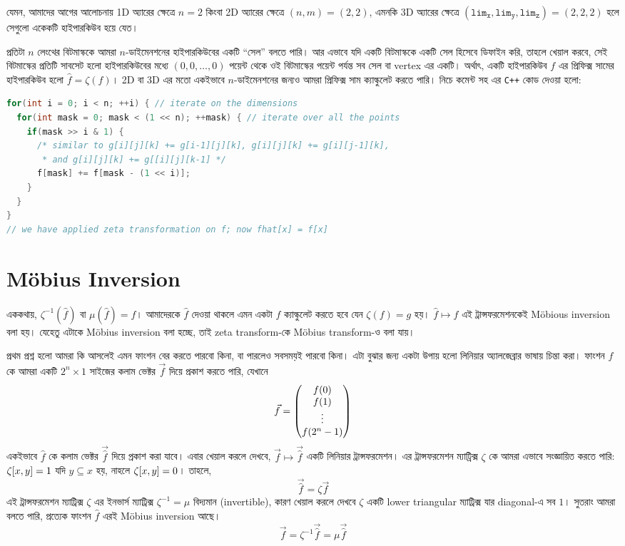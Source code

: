 যেমন, আমাদের আগের আলোচনায় 1D অ্যারের ক্ষেত্রে $n=2$ কিংবা 2D অ্যারের ক্ষেত্রে
$(n,m) = (2,2)$, এমনকি 3D অ্যারের ক্ষেত্রে $(\mathtt{lim_x}, \mathtt{lim_y},
\mathtt{lim_z}) = (2,2,2)$ হলে সেগুলো একেকটি হাইপারকিউব হয়ে যেত।

প্রতিটা $n$ লেংথের বিটমাস্ককে আমরা $n$-ডাইমেনশনের হাইপারকিউবের একটি ``সেল''
বলতে পারি। আর এভাবে যদি একটি বিটমাস্ককে একটি সেল হিসেবে ডিফাইন করি, তাহলে
খেয়াল করবে, সেই বিটমাস্কের প্রতিটি সাবসেট হলো হাইপারকিউবের মধ্যে $(0, 0,
\ldots, 0)$ পয়েন্ট থেকে ওই বিটমাস্কের পয়েন্ট পর্যন্ত সব সেল বা vertex এর
একটি। অর্থাৎ, একটি হাইপারকিউব $f$ এর প্রিফিক্স সামের হাইপারকিউব হলো $\hat{f}
= \zeta(f)$। 2D বা 3D এর মতো একইভাবে $n$-ডাইমেনশনের জন্যও আমরা প্রিফিক্স সাম
ক্যাল্কুলেট করতে পারি। নিচে কমেন্ট সহ এর \texttt{C++} কোড দেওয়া হলো:
\begin{lstlisting}[language=C++]
for(int i = 0; i < n; ++i) { // iterate on the dimensions
  for(int mask = 0; mask < (1 << n); ++mask) { // iterate over all the points
    if(mask >> i & 1) {
      /* similar to g[i][j][k] += g[i-1][j][k], g[i][j][k] += g[i][j-1][k],
       * and g[i][j][k] += g[[i][j][k-1] */
      f[mask] += f[mask - (1 << i)];
    }
  }
}
// we have applied zeta transformation on f; now fhat[x] = f[x]
\end{lstlisting}

\section{M{\"o}bius Inversion}
এককথায়, $\zeta^{-1}(\hat{f})$ বা $\mu(\hat{f}) = f$। আমাদেরকে
$\hat{f}$ দেওয়া থাকলে এমন
একটা $f$ ক্যাল্কুলেট করতে হবে যেন $\zeta(f) = g$ হয়। $\hat{f} \mapsto f$ এই
ট্রান্সফরমেশনকেই M{\"o}bious inversion বলা হয়। যেহেতু এটাকে M{\"o}bius
inversion বলা হচ্ছে, তাই zeta transform-কে M{\"o}bius transform-ও বলা যায়।

প্রথম প্রশ্ন হলো আমরা কি আসলেই এমন ফাংশন বের করতে পারবো কিনা, বা পারলেও
সবসময়ই পারবো কিনা। এটা বুঝার জন্য একটা উপায় হলো লিনিয়ার অ্যালজেব্রার ভাষায়
চিন্তা করা। ফাংশন $f$ কে আমরা একটি $2^n \times 1$ সাইজের কলাম ভেক্টর
$\vec{f}$ দিয়ে প্রকাশ করতে পারি, যেখানে 
\[
  \vec{f} =
  \begin{pmatrix}
    f(0)\\
    f(1)\\
    \vdots\\
    f(2^n-1)
  \end{pmatrix}
\]
একইভাবে $\hat{f}$ কে কলাম ভেক্টর $\vec{\hat{f}}$ দিয়ে প্রকাশ করা যাবে।
এবার খেয়াল করলে দেখবে, $\vec{f} \mapsto \vec{\hat{f}}$ একটি লিনিয়ার
ট্রান্সফরমেশন। এর
ট্রান্সফরমেশন ম্যাট্রিক্স $\zeta$ কে আমরা এভাবে সংজ্ঞায়িত করতে পারি:
$\zeta[x, y] = 1$ যদি $y \subseteq x$ হয়, নাহলে $\zeta[x, y] = 0$।
তাহলে,
\[
  \vec{\hat{f}} = \zeta \vec{f}
\]
এই ট্রান্সফরমেশন ম্যাট্রিক্স $\zeta$ এর ইনভার্স ম্যাট্রিক্স $\zeta^{-1} =
\mu$ বিদ্যমান
(invertible), কারণ খেয়াল করলে দেখবে $\zeta$ একটি lower triangular
ম্যাট্রিক্স যার diagonal-এ সব $1$। সুতরাং আমরা বলতে পারি, প্রত্যেক ফাংশন
$\hat{f}$ এরই M{\"o}bius inversion আছে।
\[
  \vec{f} = \zeta^{-1}\vec{\hat{f}} = \mu\vec{\hat{f}}
\]

